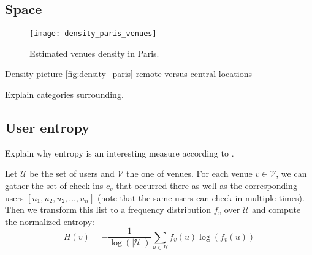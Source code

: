 \restoregeometry

\subsection{Space}

\begin{figure}[hbtp]
\texttt{[image: density\_paris\_venues]}
\caption[Venue density in Paris]{Estimated venues density in Paris.
\label{fig:density_paris}}
\end{figure}

Density picture \autoref{fig:density_paris} remote versus central
locations

Explain categories surrounding.

\subsection{User entropy}

Explain why entropy is an interesting measure according to
\autocite{Entropy10}.

Let $\mathcal{U}$ be the set of users and $\mathcal{V}$ the one of venues. For
each venue $v \in \mathcal{V}$, we can gather the set of check-ins $c_v$ that
occurred there as well as the corresponding users $[u_1, u_2, u_2, \ldots,
u_n]$ (note that the same users can check-in multiple times). Then we
transform this list to a frequency distribution $f_v$ over $\mathcal{U}$ and
compute the normalized entropy: \[
    H(v) = -\frac{1}{\log\left(\left| \mathcal{U}\right|\right)}
\sum_{u\in \mathcal{U}} f_v(u) \log(f_v(u)) \]

